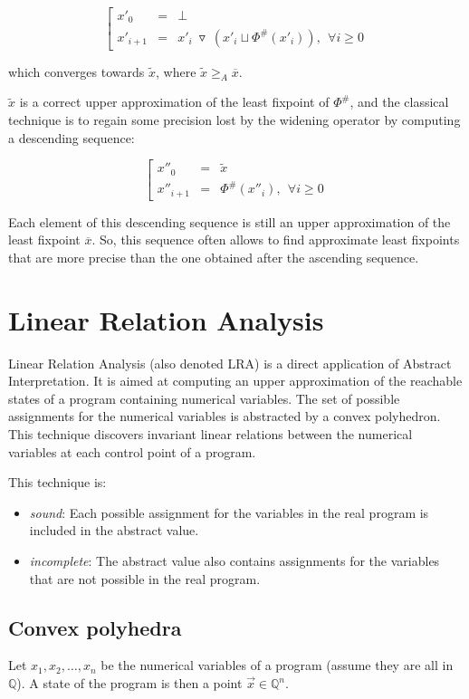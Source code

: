 \documentclass[a4paper,english,titlepage,11pt]{report}
\newcommand*\system[1]{\left[ \begin{array}{lllll}#1 \end{array}\right.}
\def\Q{\mathbb{Q}}
\newcommand{\widening}{\mathop{\triangledown}}
\begin{document}
$$\system{
x'_0 &=& \perp \\
x'_{i+1} &=& x'_i\ \widening\ ( x'_i \sqcup \Phi^\#(x'_i)),\ \ \forall i \geq 0
}$$

which converges towards $\tilde{x}$, where $\tilde{x} \geq_A \overline{x}$.

$\tilde{x}$ is a correct upper approximation of the least fixpoint of $\Phi^\#$,
and the classical technique is to regain some precision lost by the widening
operator by computing a descending sequence:

$$\system{
x''_0 &=& \tilde{x} \\
x''_{i+1} &=& \Phi^\#(x''_i), \ \ \forall i \geq 0
}$$

Each element of this descending sequence is still an upper approximation of the
least fixpoint $\overline{x}$. So, this sequence often allows to find
approximate least fixpoints that are more precise than the one obtained after
the ascending sequence.

\section{Linear Relation Analysis}

Linear Relation Analysis \cite{CH78} (also denoted LRA) is a direct application
of
Abstract Interpretation. It is aimed at computing an upper approximation of the
reachable states of a program containing numerical variables. The set of
possible assignments for the numerical variables is abstracted by a convex
polyhedron. This technique discovers invariant linear relations between
the numerical variables at each control point of a program.

This technique is:
\begin{itemize}
\item \emph{sound}: Each possible assignment for the variables in the real
program is included in the abstract value.
\item \emph{incomplete}: The abstract value also contains assignments for the
variables that are not possible in the real program.
\end{itemize}

\subsection{Convex polyhedra}

Let $x_1, x_2, \dots ,x_n$ be the numerical variables of a program (assume they
 are all in $\Q$). A state of
the program is then a point $\overrightarrow{x} \in \Q^n$.
\end{document}
